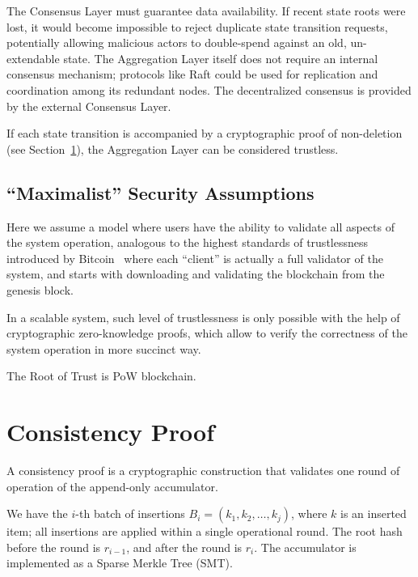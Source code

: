\documentclass[twocolumn]{article}
\begin{document}
The Consensus Layer must guarantee data availability. If recent state roots were lost, it would become impossible to reject duplicate state transition requests, potentially allowing malicious actors to double-spend against an old, un-extendable state. The Aggregation Layer itself does not require an internal consensus mechanism; protocols like Raft could be used for replication and coordination among its redundant nodes. The decentralized consensus is provided by the external Consensus Layer.

If each state transition is accompanied by a cryptographic proof of non-deletion (see Section~\ref{sec:consistency-proof}), the Aggregation Layer can be considered trustless.



\subsection{``Maximalist'' Security Assumptions}

Here we assume a model where users have the ability to validate all aspects of the system operation, analogous to the highest standards of trustlessness introduced by Bitcoin~\cite{bitcoin} where each ``client'' is actually a full validator of the system, and starts with downloading and validating the blockchain from the genesis block.

In a scalable system, such level of trustlessness is only possible with the help of cryptographic zero-knowledge proofs, which allow to verify the correctness of the system operation in more succinct way.

The Root of Trust is PoW blockchain.


\section{Consistency Proof}
\label{sec:consistency-proof}

A consistency proof is a cryptographic construction that validates one round of operation of  the append-only accumulator.

We have the $i$-th batch of insertions $B_i = (k_1, k_2, \dots, k_j)$, where $k$ is an inserted item; all insertions are applied within a single operational round. The root hash before the round is $r_{i-1}$, and after the round is $r_i$. The accumulator is implemented as a Sparse Merkle Tree (SMT).
\end{document}
